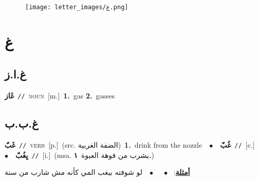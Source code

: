 \documentclass[10pt,a4paper,twoside]{article} %
\begin{document}
\begin{figure*}[t!]\centering\texttt{[image: letter\_images/غ.png]}\end{figure*}
\color{white}

 \section*{\foreignlanguage{arabic}{غ}} 
 \begin{multicols}{2} 

%
\color{black}
\vspace{-3mm}
\subsection*{\color{blue}\foreignlanguage{arabic}{غ.ا.ز}\color{blue}{ (ntws)}} 

{\setlength\topsep{0pt}\textbf{\foreignlanguage{arabic}{غَاز}}\ {\color{gray}\texttt{//}\color{black}}\ \textsc{noun}\ [m.]\ \textbf{1.}~gas  \textbf{2.}~gasses\ } \vspace{2mm}

\vspace{-3mm}
\subsection*{\color{blue}\foreignlanguage{arabic}{غ.ب.ب}\color{blue}{}} 

{\setlength\topsep{0pt}\textbf{\foreignlanguage{arabic}{غَبّ}}\ {\color{gray}\texttt{//}\color{black}}\ \textsc{verb}\ [p.]\ (src. \color{gray}\foreignlanguage{arabic}{الضفة الغربية}\color{black})\ \textbf{1.}~drink from the nozzle\ \ $\bullet$\ \ \setlength\topsep{0pt}\textbf{\foreignlanguage{arabic}{غُبّ}}\ {\color{gray}\texttt{//}\color{black}}\ [c.]\ \ $\bullet$\ \ \setlength\topsep{0pt}\textbf{\foreignlanguage{arabic}{يِغُبّ}}\ {\color{gray}\texttt{//}\color{black}}\ [i.]\ \color{gray}(msa. \foreignlanguage{arabic}{يشرب من فوهة العبوة}~\foreignlanguage{arabic}{\textbf{١.}})\color{black}\  \begin{flushright}\color{gray}\foreignlanguage{arabic}{\textbf{\underline{\foreignlanguage{arabic}{أمثلة}}}: \ $\bullet$\ \  \ $\bullet$\ \  لو شوفته بيغب المي كأنه مش شارب من سنة}\end{flushright}\color{black}} \vspace{2mm}


\end{multicols}
\end{document}

